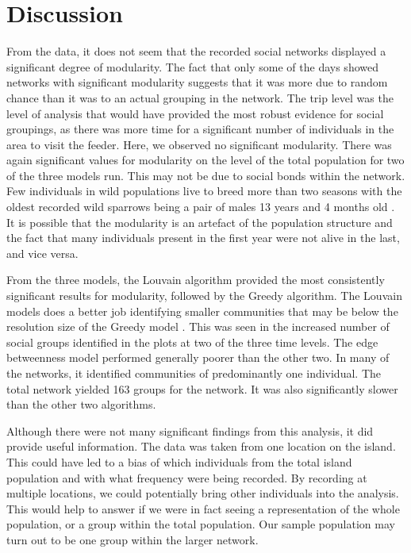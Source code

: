 \documentclass[11pt]{article}
\begin{document}
\section{Discussion}
\par From the data, it does not seem that the recorded social networks displayed a significant degree of modularity.  The fact that only some of the days showed networks with significant modularity suggests that it was more due to random chance than it was to an actual grouping in the network.  The trip level was the level of analysis that would have provided the most robust evidence for social groupings, as there was more time for a significant number of individuals in the area to visit the feeder.  Here, we observed no significant modularity.  There was again significant values for modularity on the level of the total population for two of the three models run.  This may not be due to social bonds within the network.  Few individuals in wild populations live to breed more than two seasons with the oldest recorded wild sparrows being a pair of males 13 years and 4 months old \citep{Anderson2007}. It is possible that the modularity is an artefact of the population structure and the fact that many individuals present in the first year were not alive in the last, and vice versa.  
\par From the three models, the Louvain algorithm provided the most consistently significant results for modularity, followed by the Greedy algorithm.  The Louvain models does a better job identifying smaller communities that may be below the resolution size of the Greedy model \citep{Blondel2008}⁠.  This was seen in the increased number of social groups identified in the plots at two of the three time levels.  The edge betweenness model performed generally poorer than the other two.  In many of the networks, it identified communities of predominantly one individual.  The total network yielded 163 groups for the network.  It was also significantly slower than the other two algorithms. 
\par Although there were not many significant findings from this analysis, it did provide useful information.  The data was taken from one location on the island.  This could have led to a bias of which individuals from the total island population and with what frequency were being recorded.  By recording at multiple locations, we could potentially bring other individuals into the analysis. This would help to answer if we were in fact seeing a representation of the whole population, or a group within the total population.  Our sample population may turn out to be one group within the larger network.
\end{document}
